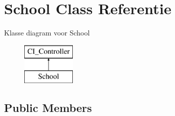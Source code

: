 \hypertarget{class_school}{}\section{School Class Referentie}
\label{class_school}
Klasse diagram voor School\begin{figure}[H]
\begin{center}
\leavevmode
\includegraphics[height=2.000000cm]{class_school}
\end{center}
\end{figure}
\subsection*{Public Members}
